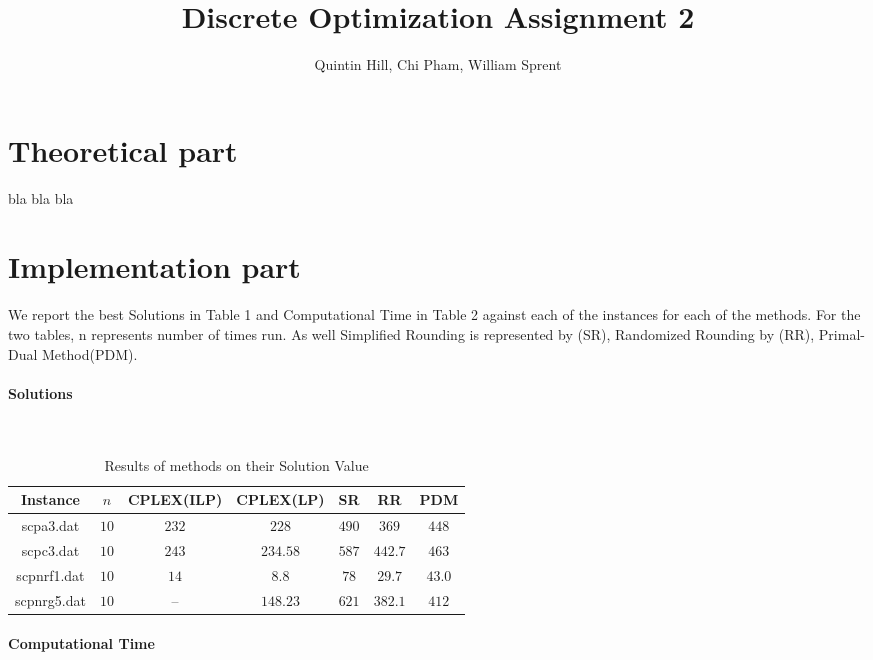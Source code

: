 \documentclass[11pt,a4paper,english]{article}
\begin{document}
\title{Discrete Optimization Assignment 2}
\author{Quintin Hill, Chi Pham, William Sprent}
\maketitle
\tableofcontents
\clearpage

\section{Theoretical part}
bla bla bla
\clearpage

\section{Implementation part}

We report the best Solutions in Table 1 and Computational Time in Table 2 against each of the instances for each of the methods. For the two tables, n represents number of times run. As well Simplified Rounding is represented by (SR), Randomized Rounding by (RR), Primal-Dual Method(PDM).
\paragraph{Solutions}\mbox{}\\


\begin{table}[h!]
  \centering
  \begin{tabular}{|c|c|c|c|c|c|c|}\hline
    Instance& $n$& CPLEX(ILP)&CPLEX(LP)&SR&RR&PDM  \\\hline
    scpa3.dat &$10$&$232$ & $228$ & $490$& $369$ & $448$  \\
    scpc3.dat &$10$&$243$ & $234.58$ & $587$& $442.7$ & $463$ \\
    scpnrf1.dat &$10$&$14$ & $8.8$ & $78$& $29.7$ & $43.0$  \\
    scpnrg5.dat &$10$&-- & $148.23$ & $621$& $382.1$ & $412$  \\\hline
  \end{tabular}
  \caption{Results of methods on their Solution Value}
  \label{tab:res}
\end{table}

\paragraph{Computational Time}\mbox{}\\
\end{document}

